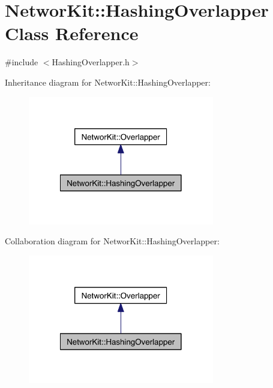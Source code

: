 \hypertarget{class_networ_kit_1_1_hashing_overlapper}{\section{Networ\-Kit\-:\-:Hashing\-Overlapper Class Reference}
\label{class_networ_kit_1_1_hashing_overlapper}
}


{\ttfamily \#include $<$Hashing\-Overlapper.\-h$>$}



Inheritance diagram for Networ\-Kit\-:\-:Hashing\-Overlapper\-:\nopagebreak
\begin{figure}[H]
\begin{center}
\leavevmode
\includegraphics[width=230pt]{class_networ_kit_1_1_hashing_overlapper__inherit__graph}
\end{center}
\end{figure}


Collaboration diagram for Networ\-Kit\-:\-:Hashing\-Overlapper\-:\nopagebreak
\begin{figure}[H]
\begin{center}
\leavevmode
\includegraphics[width=230pt]{class_networ_kit_1_1_hashing_overlapper__coll__graph}
\end{center}
\end{figure}
